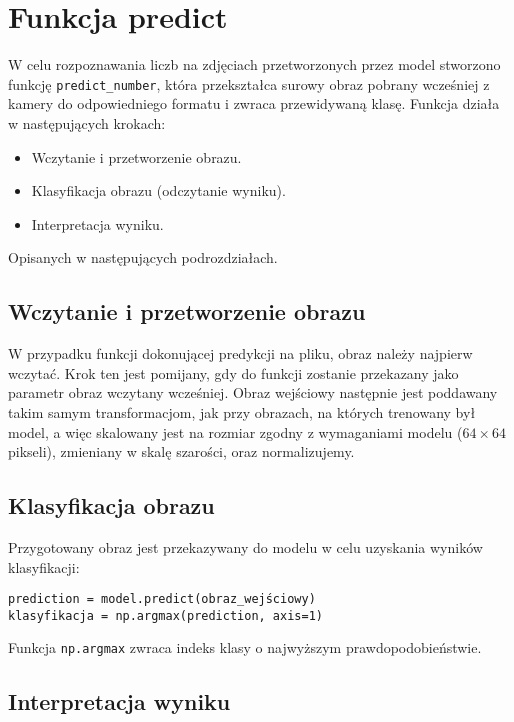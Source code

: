\section{Funkcja predict}\label{sec:funkcja-predict}

W celu rozpoznawania liczb na zdjęciach przetworzonych przez model stworzono funkcję \texttt{predict\_number},
która przekształca surowy obraz pobrany wcześniej z kamery do odpowiedniego formatu i zwraca przewidywaną klasę.
Funkcja działa w następujących krokach:
\begin{itemize}
    \item Wczytanie i przetworzenie obrazu.
    \item Klasyfikacja obrazu (odczytanie wyniku).
    \item Interpretacja wyniku.
\end{itemize}
Opisanych w następujących podrozdziałach.

\subsection{Wczytanie i przetworzenie obrazu}\label{subsec:wczytanie-i-przetworzenie-obrazu}

W przypadku funkcji dokonującej predykcji na pliku, obraz należy najpierw wczytać.
Krok ten jest pomijany, gdy do funkcji zostanie przekazany jako parametr obraz wczytany wcześniej.
Obraz wejściowy następnie jest poddawany takim samym transformacjom, jak przy obrazach, na których trenowany był model,
a więc skalowany jest na rozmiar zgodny z wymaganiami modelu ($64 \times 64$ pikseli), zmieniany w skalę szarości, oraz normalizujemy.

\subsection{Klasyfikacja obrazu}\label{subsec:klasyfikacja-obrazu}

Przygotowany obraz jest przekazywany do modelu w celu uzyskania wyników klasyfikacji:

\begin{verbatim}
prediction = model.predict(obraz_wejściowy)
klasyfikacja = np.argmax(prediction, axis=1)
\end{verbatim}

Funkcja \texttt{np.argmax} zwraca indeks klasy o najwyższym prawdopodobieństwie.

\subsection{Interpretacja wyniku}\label{subsec:interpretacja-wyniku}

